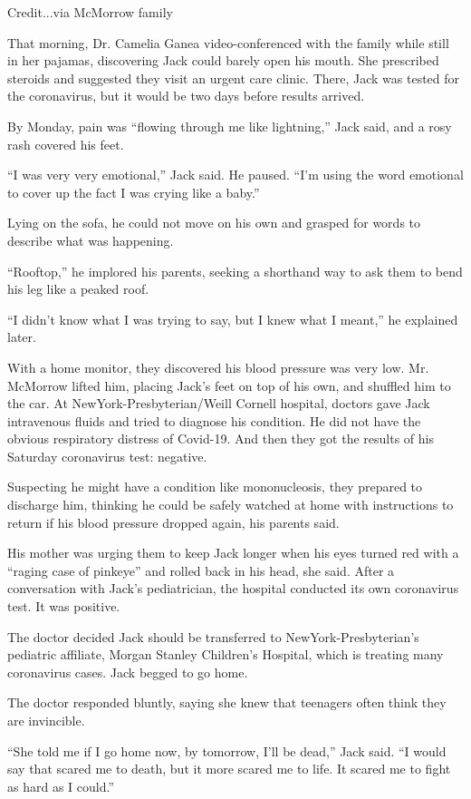 Credit...via McMorrow family

That morning, Dr. Camelia Ganea video-conferenced with the family while
still in her pajamas, discovering Jack could barely open his mouth. She
prescribed steroids and suggested they visit an urgent care clinic.
There, Jack was tested for the coronavirus, but it would be two days
before results arrived.

By Monday, pain was ``flowing through me like lightning,'' Jack said,
and a rosy rash covered his feet.

``I was very very emotional,'' Jack said. He paused. ``I'm using the
word emotional to cover up the fact I was crying like a baby.''

Lying on the sofa, he could not move on his own and grasped for words to
describe what was happening.

``Rooftop,'' he implored his parents, seeking a shorthand way to ask
them to bend his leg like a peaked roof.

``I didn't know what I was trying to say, but I knew what I meant,'' he
explained later.

With a home monitor, they discovered his blood pressure was very low.
Mr. McMorrow lifted him, placing Jack's feet on top of his own, and
shuffled him to the car. At NewYork-Presbyterian/Weill Cornell hospital,
doctors gave Jack intravenous fluids and tried to diagnose his
condition. He did not have the obvious respiratory distress of Covid-19.
And then they got the results of his Saturday coronavirus test:
negative.

Suspecting he might have a condition like mononucleosis, they prepared
to discharge him, thinking he could be safely watched at home with
instructions to return if his blood pressure dropped again, his parents
said.

His mother was urging them to keep Jack longer when his eyes turned red
with a ``raging case of pinkeye'' and rolled back in his head, she said.
After a conversation with Jack's pediatrician, the hospital conducted
its own coronavirus test. It was positive.

The doctor decided Jack should be transferred to NewYork-Presbyterian's
pediatric affiliate, Morgan Stanley Children's Hospital, which is
treating many coronavirus cases. Jack begged to go home.

The doctor responded bluntly, saying she knew that teenagers often think
they are invincible.

``She told me if I go home now, by tomorrow, I'll be dead,'' Jack said.
``I would say that scared me to death, but it more scared me to life. It
scared me to fight as hard as I could.''


